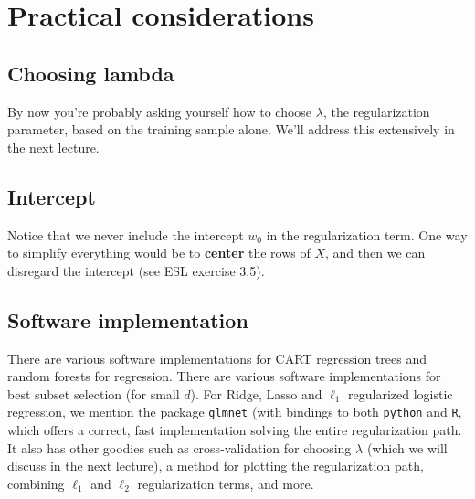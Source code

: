 \documentclass[11pt]{article}
\begin{document}
\section{Practical considerations}

\subsection{Choosing lambda}

By now you're probably asking yourself how to choose $\lambda$, the
regularization parameter, based on the training sample alone. We'll address this
extensively in the next lecture.

\subsection{Intercept}

Notice that we never include the intercept $w_0$ in the regularization term. One
way to simplify everything would be to {\bf center} the rows of $X$, and then we
can disregard the intercept (see ESL exercise 3.5).

\subsection{Software implementation}

There are various software implementations for CART regression trees and random
forests for regression. There are various software implementations for best
subset selection (for small $d$).
For Ridge, Lasso and $\ell_1$ regularized logistic regression, we mention the
package 
{\tt glmnet} (with bindings to both {\tt python} and {\tt R}, which offers a correct, fast implementation solving the entire
regularization path. It also has other goodies such as cross-validation for
choosing $\lambda$ (which we will discuss in the next lecture), a method for
plotting the regularization path, combining $\ell_1$ and $\ell_2$
regularization terms, and more.
\end{document}
